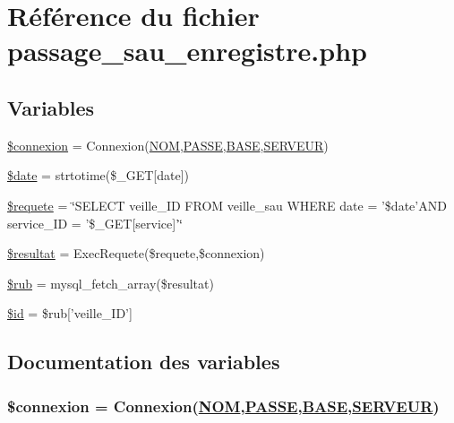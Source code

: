 \hypertarget{passage__sau__enregistre_8php}{
\section{R\'{e}f\'{e}rence du fichier passage\_\-sau\_\-enregistre.php}
\label{passage__sau__enregistre_8php}
}
\subsection*{Variables}
\begin{CompactItemize}
\item 
\hyperlink{passage__sau__enregistre_8php_a0}{\$connexion} = Connexion(\hyperlink{pma__connect_8php_a0}{NOM},\hyperlink{pma__connect_8php_a1}{PASSE},\hyperlink{pma__connect_8php_a3}{BASE},\hyperlink{pma__connect_8php_a2}{SERVEUR})
\item 
\hyperlink{passage__sau__enregistre_8php_a1}{\$date} = strtotime(\$\_\-GET\mbox{[}date\mbox{]})
\item 
\hyperlink{passage__sau__enregistre_8php_a2}{\$requete} = \char`\"{}SELECT veille\_\-ID FROM veille\_\-sau WHERE date = '\$date'AND service\_\-ID = '\$\_\-GET\mbox{[}service\mbox{]}'\char`\"{}
\item 
\hyperlink{passage__sau__enregistre_8php_a3}{\$resultat} = Exec\-Requete(\$requete,\$connexion)
\item 
\hyperlink{passage__sau__enregistre_8php_a4}{\$rub} = mysql\_\-fetch\_\-array(\$resultat)
\item 
\hyperlink{passage__sau__enregistre_8php_a5}{\$id} = \$rub\mbox{[}'veille\_\-ID'\mbox{]}
\end{CompactItemize}


\subsection{Documentation des variables}
\hypertarget{passage__sau__enregistre_8php_a0}{
\subsubsection[\$connexion]{\setlength{\rightskip}{0pt plus 5cm}\$connexion = Connexion(\hyperlink{pma__connect_8php_a0}{NOM},\hyperlink{pma__connect_8php_a1}{PASSE},\hyperlink{pma__connect_8php_a3}{BASE},\hyperlink{pma__connect_8php_a2}{SERVEUR})}}
\label{passage__sau__enregistre_8php_a0}


